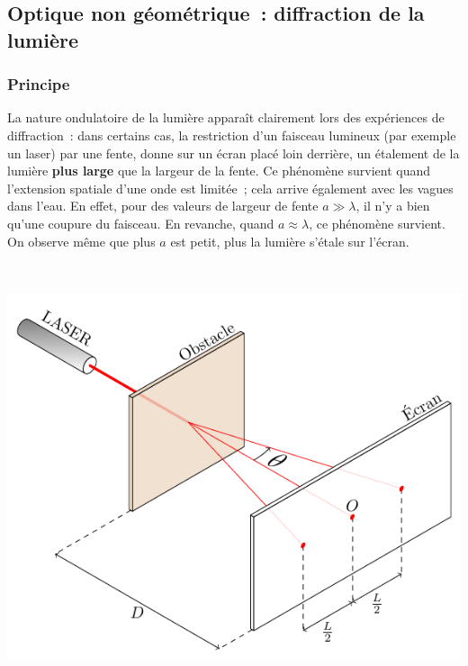 \documentclass[../../main/main.tex]{subfiles}
\begin{document}
\subsection{Optique non géométrique~: diffraction de la lumière}
\label{ssec:optdiff}
\subsubsection{Principe}

\noindent
\begin{minipage}[t]{.48\linewidth}
	La nature ondulatoire de la lumière apparaît clairement lors des expériences de
	diffraction~: dans certains cas, la restriction d'un faisceau lumineux (par
	exemple un laser) par une fente, donne sur un écran placé loin derrière, un
	étalement de la lumière \textbf{plus large} que la largeur de la fente.
	\smallbreak
	Ce phénomène survient quand l'extension spatiale d'une onde est limitée~; cela
	arrive également avec les vagues dans l'eau. En effet, pour des valeurs de
	largeur de fente $a \gg \lambda$, il n'y a bien qu'une coupure du faisceau. En
	revanche, quand $a \approx \lambda$, ce phénomène survient. On observe même que
	plus $a$ est petit, plus la lumière s'étale sur l'écran.
\end{minipage}
\hfill
\begin{minipage}[t]{.48\linewidth}
	~
	\vspace*{-30pt}
	\begin{center}
		\includegraphics[width=.8\linewidth]{diffraction}
		\label{fig:diff_las}
	\end{center}
\end{minipage}
\end{document}
